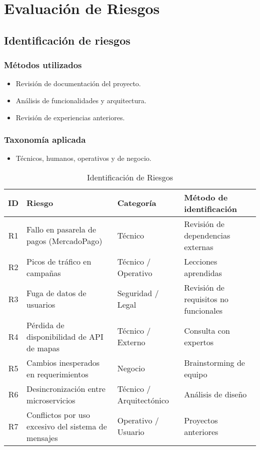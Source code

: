 \section{Evaluación de Riesgos}
	\subsection{Identificación de riesgos}
		\subsubsection*{Métodos utilizados}
			\begin{itemize}
				\item Revisión de documentación del proyecto.
				\item Análisis de funcionalidades y arquitectura.
				\item Revisión de experiencias anteriores.
			\end{itemize}
		
		\subsubsection*{Taxonomía aplicada}
			\begin{itemize}
				\item Técnicos, humanos, operativos y de negocio.
			\end{itemize}
	
	\begin{table}[H]
		\centering
		\caption{Identificación de Riesgos}
		\begin{tabularx}{\textwidth}{|c|X|X|X|}
			\hline
			\textbf{ID} & \textbf{Riesgo} & \textbf{Categoría} & \textbf{Método de identificación} \\
			\hline
			R1 & Fallo en pasarela de pagos (MercadoPago) & Técnico & Revisión de dependencias externas \\
			R2 & Picos de tráfico en campañas & Técnico / Operativo & Lecciones aprendidas \\
			R3 & Fuga de datos de usuarios & Seguridad / Legal & Revisión de requisitos no funcionales \\
			R4 & Pérdida de disponibilidad de API de mapas & Técnico / Externo & Consulta con expertos \\
			R5 & Cambios inesperados en requerimientos & Negocio & Brainstorming de equipo \\
			R6 & Desincronización entre microservicios & Técnico / Arquitectónico & Análisis de diseño \\
			R7 & Conflictos por uso excesivo del sistema de mensajes & Operativo / Usuario & Proyectos anteriores \\
			\hline
		\end{tabularx}
	\end{table}
	
